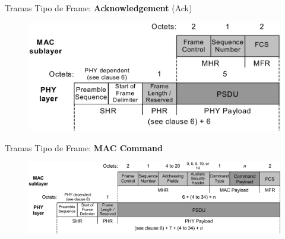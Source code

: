 \documentclass[aspectratio=169, handout]{beamer}
\begin{document}
\begin{frame}[t]{Tramas}
Tipo de Frame: \textbf{Acknowledgement} (Ack)
\vspace{10px}
	\begin{figure}[H]
	\centering
		\includegraphics[width=.7\textwidth]{./imagenes/ack.jpg}
	\end{figure}	  	  	
\end{frame}

\begin{frame}[t]{Tramas}
Tipo de Frame: \textbf{MAC Command}
\vspace{10px}
	\begin{figure}[H]
		\includegraphics[width=1\textwidth]{./imagenes/maccommand.jpg}
	\end{figure}	  	  	
\end{frame}
\end{document}
